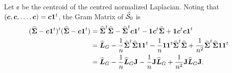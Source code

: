 Let $\cent$ be the centroid of the centred normalized Laplacian. Noting that $(\cent,\cent,\dots,\cent)=\cent\one^\tp$, 
the Gram Matrix of $\splxn_0$ is 
\begin{align*}
(\Svn-\cent\one^\tp)^\tp(\Svn-\cent\one^\tp) &= \Svn^\tp\Svn - \Svn^\tp\cent\one^\tp - \one\cent^\tp\Svn + \one\cent^\tp\cent\one^\tp \\
&= \Ln_G - \frac{1}{n} \Svn^\tp\Svn\one\one^\tp - \frac{1}{n}\one\one^\tp\Svn^\tp\Svn + \frac{1}{n^2}\Svn^\tp\Svn\one\one^\tp \\
&= \Ln_G - \frac{1}{n}\Ln_G\J - \frac{1}{n} \J\Ln_G+ \frac{1}{n^2}\J\Ln_G\J.\\
\end{align*}








